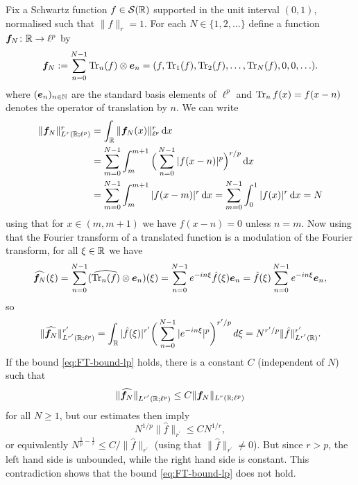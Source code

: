 \begin{example}
  Fix a Schwartz function $f \in \mathcal{S}(\mathbb{R})$ supported in the unit interval $(0,1)$, normalised such that $\|f\|_r = 1$.
  For each $N \in \{1,2,\ldots\}$ define a function $\bm{f}_N \colon \mathbb{R} \rightarrow \ell^p$ by
  \begin{equation*}
      \bm{f}_N := \sum_{n=0}^{N-1} \operatorname{Tr}_{n}(f) \otimes \bm{e}_n
      = (f, \operatorname{Tr}_{1}(f), \operatorname{Tr}_{2}(f), \ldots, \operatorname{Tr}_{N}(f), 0, 0, \ldots).
  \end{equation*}
  where $(\bm{e}_{n})_{n \in \mathbb{N}}$ are the standard basis elements of $\ell^p$ and $\operatorname{Tr}_{n}f(x) = f(x-n)$ denotes the operator of translation by $n$.
  We can write
  \begin{equation*}
    \begin{aligned}
      \|\bm{f}_N\|_{L^r(\mathbb{R};\ell^p)}^{r}
      &= \int_{\mathbb{R}} \|\bm{f}_N(x)\|_{\ell^p}^r \, \mathrm{d} x  \\
      &= \sum_{m=0}^{N-1} \int_{m}^{m+1} \Big(\sum_{n=0}^{N-1} |f(x-n)|^p \Big)^{r/p} \, \mathrm{d} x \\
      &= \sum_{m=0}^{N-1} \int_{m}^{m+1} |f(x-m)|^r \, \mathrm{d} x 
      = \sum_{m=0}^{N-1} \int_0^1 |f(x)|^r \, \mathrm{d} x = N
    \end{aligned}
  \end{equation*}
  using that for $x \in (m,m+1)$ we have $f(x-n) = 0$ unless $n=m$.
  Now using that the Fourier transform of a translated function is a modulation of the Fourier transform, for all $\xi \in \mathbb{R}$ we have
  \begin{equation*}
      \widehat{\bm{f}_N}(\xi) = \sum_{n=0}^{N-1} (\widehat{\operatorname{Tr}_{n}(f)} \otimes \bm{e}_n)(\xi) 
      = \sum_{n=0}^{N-1} e^{-in\xi} \hat{f}(\xi) \bm{e}_n 
      = \hat{f}(\xi) \sum_{n=0}^{N-1} e^{-in\xi} \bm{e}_n,
  \end{equation*}
  so
  \begin{equation*}
    \|\widehat{\bm{f}_N}\|_{L^{r^\prime}(\mathbb{R};\ell^p)}^{r'}
    = \int_{\mathbb{R}} |\hat{f}(\xi)|^{r^\prime} \bigg( \sum_{n=0}^{N-1} |e^{-in\xi}|^p \bigg)^{r^\prime/p} \, d\xi 
    = N^{r'/p} \|\hat{f}\|_{L^{r^\prime}(\mathbb{R})}^{r'}.
  \end{equation*}
  If the bound \eqref{eq:FT-bound-lp} holds, there is a constant $C$ (independent of $N$) such that
  \begin{equation*}
    \|\widehat{\bm{f}_N}\|_{L^{r^\prime}(\mathbb{R};\ell^p)} \leq C \|\bm{f}_N\|_{L^r(\mathbb{R};\ell^p)}
  \end{equation*}
  for all $N \geq 1$, but our estimates then imply
  \begin{equation*}
    N^{1/p} \|\hat{f}\|_{r^\prime} \leq C N^{1/r},
  \end{equation*}
  or equivalently $N^{\frac{1}{p} - \frac{1}{r}} \leq C/\|\hat{f}\|_{r^\prime}$ (using that $\|\hat{f}\|_{r^\prime} \neq 0$).
  But since $r > p$, the left hand side is unbounded, while the right hand side is constant.
  This contradiction shows that the bound \eqref{eq:FT-bound-lp} does not hold.
\end{example}



